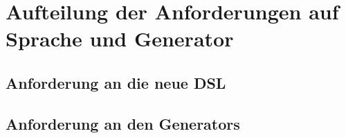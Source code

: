 \chapter{Aufteilung der Anforderungen auf Sprache und
Generator}\label{Aufteilung der Anforderungen auf Sprache und
Generator}
\section{Anforderung an die neue DSL}
\section{Anforderung an den Generators}